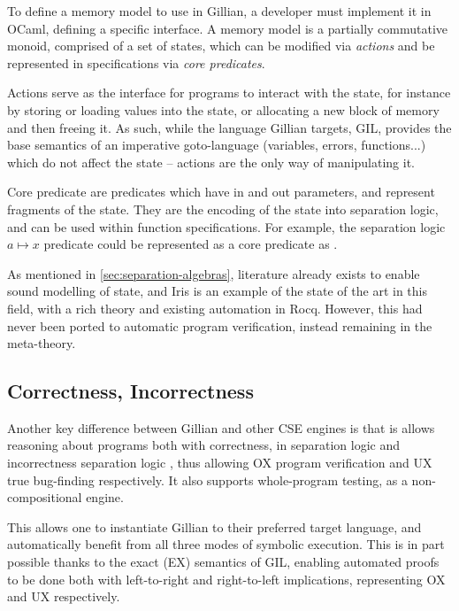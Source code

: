 To define a memory model to use in Gillian, a developer must implement it in OCaml, defining a specific interface. A memory model is a partially commutative monoid, comprised of a set of states, which can be modified via \emph{actions} and be represented in specifications via \emph{core predicates}.

Actions serve as the interface for programs to interact with the state, for instance by storing or loading values into the state, or allocating a new block of memory and then freeing it. As such, while the language Gillian targets, GIL, provides the base semantics of an imperative goto-language (variables, errors, functions...) which do not affect the state -- actions are the only way of manipulating it.

Core predicate are predicates which have in and out parameters, and represent fragments of the state. They are the encoding of the state into separation logic, and can be used within function specifications. For example, the separation logic $a \mapsto x$ predicate could be represented as a core predicate as .

As mentioned in \autoref{sec:separation-algebras}, literature already exists to enable sound modelling of state, and Iris \cite{iris} is an example of the state of the art in this field, with a rich theory and existing automation in Rocq. However, this had never been ported to automatic program verification, instead remaining in the meta-theory.

\subsection{Correctness, Incorrectness}

Another key difference between Gillian and other CSE engines is that is allows reasoning about programs both with correctness, in separation logic \cite{seplogic1, seplogic2} and incorrectness separation logic \cite{isl}, thus allowing OX program verification and UX true bug-finding respectively. It also supports whole-program testing, as a non-compositional engine.

This allows one to instantiate Gillian to their preferred target language, and automatically benefit from all three modes of symbolic execution. This is in part possible thanks to the exact (EX) \cite{exactsl} semantics of GIL, enabling automated proofs to be done both with left-to-right and right-to-left implications, representing OX and UX respectively.

